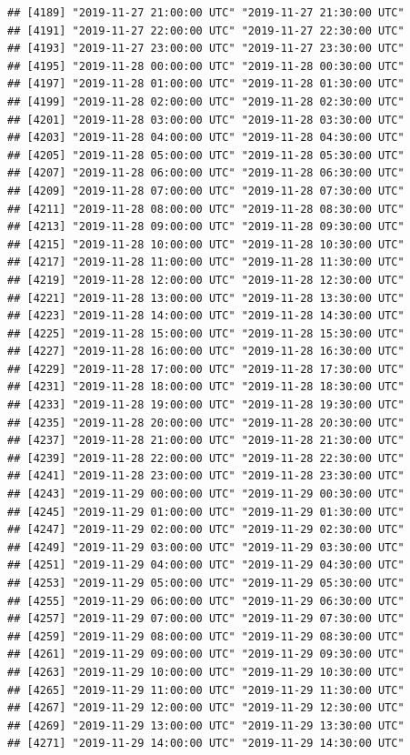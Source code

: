 \documentclass{article}\usepackage[]{graphicx}\usepackage[]{color}
\makeatletter
\newenvironment{kframe}{%
 \def\at@end@of@kframe{}%
 \ifinner\ifhmode%
  \def\at@end@of@kframe{\end{minipage}}%
  \begin{minipage}{\columnwidth}%
 \fi\fi%
 \def\FrameCommand##1{\hskip\@totalleftmargin \hskip-\fboxsep
 \colorbox{shadecolor}{##1}\hskip-\fboxsep
     \hskip-\linewidth \hskip-\@totalleftmargin \hskip\columnwidth}%
 \MakeFramed {\advance\hsize-\width
   \@totalleftmargin\z@ \linewidth\hsize
   \@setminipage}}%
 {\par\unskip\endMakeFramed%
 \at@end@of@kframe}
\newenvironment{knitrout}{}{} %
\makeatother
\begin{document}
\begin{knitrout}
\begin{kframe}
\begin{verbatim}
## [4189] "2019-11-27 21:00:00 UTC" "2019-11-27 21:30:00 UTC"
## [4191] "2019-11-27 22:00:00 UTC" "2019-11-27 22:30:00 UTC"
## [4193] "2019-11-27 23:00:00 UTC" "2019-11-27 23:30:00 UTC"
## [4195] "2019-11-28 00:00:00 UTC" "2019-11-28 00:30:00 UTC"
## [4197] "2019-11-28 01:00:00 UTC" "2019-11-28 01:30:00 UTC"
## [4199] "2019-11-28 02:00:00 UTC" "2019-11-28 02:30:00 UTC"
## [4201] "2019-11-28 03:00:00 UTC" "2019-11-28 03:30:00 UTC"
## [4203] "2019-11-28 04:00:00 UTC" "2019-11-28 04:30:00 UTC"
## [4205] "2019-11-28 05:00:00 UTC" "2019-11-28 05:30:00 UTC"
## [4207] "2019-11-28 06:00:00 UTC" "2019-11-28 06:30:00 UTC"
## [4209] "2019-11-28 07:00:00 UTC" "2019-11-28 07:30:00 UTC"
## [4211] "2019-11-28 08:00:00 UTC" "2019-11-28 08:30:00 UTC"
## [4213] "2019-11-28 09:00:00 UTC" "2019-11-28 09:30:00 UTC"
## [4215] "2019-11-28 10:00:00 UTC" "2019-11-28 10:30:00 UTC"
## [4217] "2019-11-28 11:00:00 UTC" "2019-11-28 11:30:00 UTC"
## [4219] "2019-11-28 12:00:00 UTC" "2019-11-28 12:30:00 UTC"
## [4221] "2019-11-28 13:00:00 UTC" "2019-11-28 13:30:00 UTC"
## [4223] "2019-11-28 14:00:00 UTC" "2019-11-28 14:30:00 UTC"
## [4225] "2019-11-28 15:00:00 UTC" "2019-11-28 15:30:00 UTC"
## [4227] "2019-11-28 16:00:00 UTC" "2019-11-28 16:30:00 UTC"
## [4229] "2019-11-28 17:00:00 UTC" "2019-11-28 17:30:00 UTC"
## [4231] "2019-11-28 18:00:00 UTC" "2019-11-28 18:30:00 UTC"
## [4233] "2019-11-28 19:00:00 UTC" "2019-11-28 19:30:00 UTC"
## [4235] "2019-11-28 20:00:00 UTC" "2019-11-28 20:30:00 UTC"
## [4237] "2019-11-28 21:00:00 UTC" "2019-11-28 21:30:00 UTC"
## [4239] "2019-11-28 22:00:00 UTC" "2019-11-28 22:30:00 UTC"
## [4241] "2019-11-28 23:00:00 UTC" "2019-11-28 23:30:00 UTC"
## [4243] "2019-11-29 00:00:00 UTC" "2019-11-29 00:30:00 UTC"
## [4245] "2019-11-29 01:00:00 UTC" "2019-11-29 01:30:00 UTC"
## [4247] "2019-11-29 02:00:00 UTC" "2019-11-29 02:30:00 UTC"
## [4249] "2019-11-29 03:00:00 UTC" "2019-11-29 03:30:00 UTC"
## [4251] "2019-11-29 04:00:00 UTC" "2019-11-29 04:30:00 UTC"
## [4253] "2019-11-29 05:00:00 UTC" "2019-11-29 05:30:00 UTC"
## [4255] "2019-11-29 06:00:00 UTC" "2019-11-29 06:30:00 UTC"
## [4257] "2019-11-29 07:00:00 UTC" "2019-11-29 07:30:00 UTC"
## [4259] "2019-11-29 08:00:00 UTC" "2019-11-29 08:30:00 UTC"
## [4261] "2019-11-29 09:00:00 UTC" "2019-11-29 09:30:00 UTC"
## [4263] "2019-11-29 10:00:00 UTC" "2019-11-29 10:30:00 UTC"
## [4265] "2019-11-29 11:00:00 UTC" "2019-11-29 11:30:00 UTC"
## [4267] "2019-11-29 12:00:00 UTC" "2019-11-29 12:30:00 UTC"
## [4269] "2019-11-29 13:00:00 UTC" "2019-11-29 13:30:00 UTC"
## [4271] "2019-11-29 14:00:00 UTC" "2019-11-29 14:30:00 UTC"

\end{verbatim}
\end{kframe}
\end{knitrout}
\end{document}

